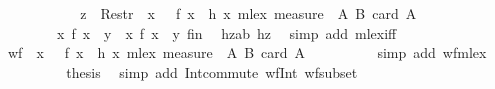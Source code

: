 \begin{isabellebody}
\ \ \ \ \ \ \ \ \isamarkupfalse%
\ \isamarkupfalse%
\ {\isachardoublequoteopen}z\ {\isasymin}\ Restr\ {\isacharparenleft}{\kern0pt}{\isacharparenleft}{\kern0pt}{\isacharparenleft}{\kern0pt}{\isasymlambda}\ x{\isachardot}{\kern0pt}\ {}\ {\isacharasterisk}{\kern0pt}\ f\ x\ {\isacharminus}{\kern0pt}\ h\ x{\isacharparenright}{\kern0pt}\ {\isacharless}{\kern0pt}{\isacharasterisk}{\kern0pt}mlex{\isacharasterisk}{\kern0pt}{\isachargreater}{\kern0pt}\ measure\ {\isacharparenleft}{\kern0pt}{\isasymlambda}\ {\isacharparenleft}{\kern0pt}A{\isacharcomma}{\kern0pt}\ B{\isacharparenright}{\kern0pt}{\isachardot}{\kern0pt}\ card\ A{\isacharparenright}{\kern0pt}{\isacharparenright}{\kern0pt}\ {\isasyminter}\ \isanewline
\ \ \ \ \ \ \ \ {\isacharbraceleft}{\kern0pt}x{\isachardot}{\kern0pt}\ f\ x\ {\isacharequal}{\kern0pt}\ y{\isacharbraceright}{\kern0pt}\ {\isasymtimes}\ {\isacharbraceleft}{\kern0pt}x{\isachardot}{\kern0pt}\ f\ x\ {\isacharequal}{\kern0pt}\ y{\isacharbraceright}{\kern0pt}{\isacharparenright}{\kern0pt}\ {\isacharquery}{\kern0pt}fin{\isachardoublequoteclose}\ \isamarkupfalse%
\ hzab\ hz\ \isamarkupfalse%
\ {\isacharparenleft}{\kern0pt}simp\ add{\isacharcolon}{\kern0pt}\ mlex{\isacharunderscore}{\kern0pt}iff{\isacharparenright}{\kern0pt}\isanewline
\ \ \ \ \ \ \isamarkupfalse%
\isanewline
\ \ \ \ \ \ \isamarkupfalse%
\ \isamarkupfalse%
\ {\isachardoublequoteopen}wf\ {\isacharparenleft}{\kern0pt}{\isacharparenleft}{\kern0pt}{\isasymlambda}\ x{\isachardot}{\kern0pt}\ {}\ {\isacharasterisk}{\kern0pt}\ f\ x\ {\isacharminus}{\kern0pt}\ h\ x{\isacharparenright}{\kern0pt}\ {\isacharless}{\kern0pt}{\isacharasterisk}{\kern0pt}mlex{\isacharasterisk}{\kern0pt}{\isachargreater}{\kern0pt}\ measure\ {\isacharparenleft}{\kern0pt}{\isasymlambda}\ {\isacharparenleft}{\kern0pt}A{\isacharcomma}{\kern0pt}\ B{\isacharparenright}{\kern0pt}{\isachardot}{\kern0pt}\ card\ A{\isacharparenright}{\kern0pt}{\isacharparenright}{\kern0pt}{\isachardoublequoteclose}\isanewline
\ \ \ \ \ \ \ \ \isamarkupfalse%
\ {\isacharparenleft}{\kern0pt}simp\ add{\isacharcolon}{\kern0pt}\ wf{\isacharunderscore}{\kern0pt}mlex{\isacharparenright}{\kern0pt}\isanewline
\ \ \ \ \ \ \isamarkupfalse%
\ \isamarkupfalse%
\ {\isacharquery}{\kern0pt}thesis\ \isamarkupfalse%
\ {\isacharparenleft}{\kern0pt}simp\ add{\isacharcolon}{\kern0pt}\ Int{\isacharunderscore}{\kern0pt}commute\ wf{\isacharunderscore}{\kern0pt}Int{}\ wf{\isacharunderscore}{\kern0pt}subset{\isacharparenright}{\kern0pt}\isanewline

\end{isabellebody}
